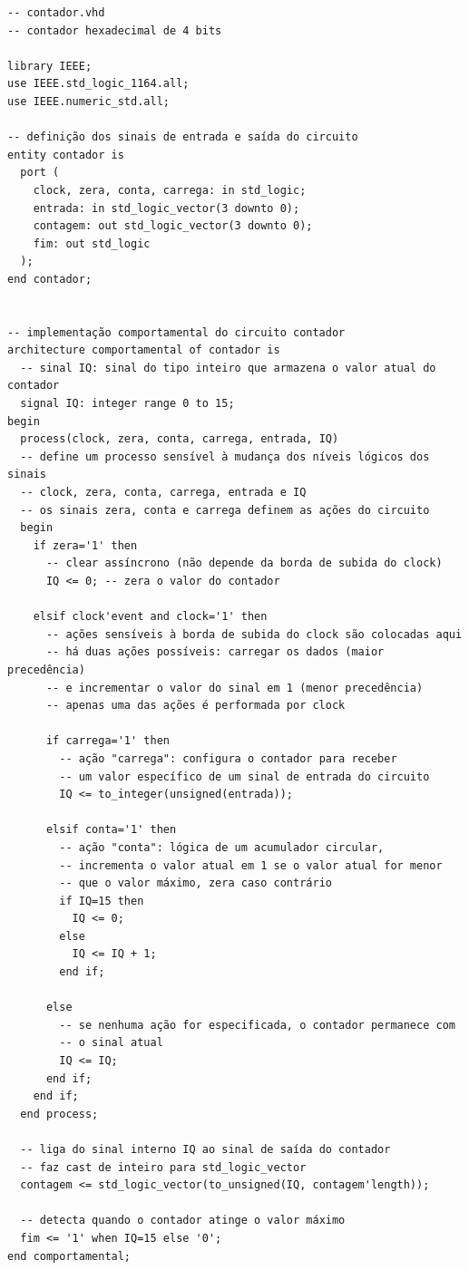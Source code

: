 \documentclass[a4,12pt]{horizon-theme}
\newenvironment{code}{\captionsetup{type=listing}}{}
\begin{document}
\newpage
\begin{code}
  \label{lst:contador}
  \begin{verbatim}
-- contador.vhd
-- contador hexadecimal de 4 bits

library IEEE;
use IEEE.std_logic_1164.all;
use IEEE.numeric_std.all;

-- definição dos sinais de entrada e saída do circuito
entity contador is
  port (
    clock, zera, conta, carrega: in std_logic;
    entrada: in std_logic_vector(3 downto 0);
    contagem: out std_logic_vector(3 downto 0);
    fim: out std_logic
  );
end contador;


-- implementação comportamental do circuito contador
architecture comportamental of contador is
  -- sinal IQ: sinal do tipo inteiro que armazena o valor atual do contador
  signal IQ: integer range 0 to 15;
begin
  process(clock, zera, conta, carrega, entrada, IQ)
  -- define um processo sensível à mudança dos níveis lógicos dos sinais
  -- clock, zera, conta, carrega, entrada e IQ
  -- os sinais zera, conta e carrega definem as ações do circuito
  begin
    if zera='1' then
      -- clear assíncrono (não depende da borda de subida do clock)
      IQ <= 0; -- zera o valor do contador
    
    elsif clock'event and clock='1' then
      -- ações sensíveis à borda de subida do clock são colocadas aqui
      -- há duas ações possíveis: carregar os dados (maior precedência) 
      -- e incrementar o valor do sinal em 1 (menor precedência)
      -- apenas uma das ações é performada por clock
      
      if carrega='1' then
        -- ação "carrega": configura o contador para receber 
        -- um valor específico de um sinal de entrada do circuito
        IQ <= to_integer(unsigned(entrada));
      
      elsif conta='1' then  
        -- ação "conta": lógica de um acumulador circular, 
        -- incrementa o valor atual em 1 se o valor atual for menor 
        -- que o valor máximo, zera caso contrário
        if IQ=15 then 
          IQ <= 0;
        else 
          IQ <= IQ + 1;
        end if;
      
      else
        -- se nenhuma ação for especificada, o contador permanece com
        -- o sinal atual
        IQ <= IQ;
      end if;
    end if;
  end process;

  -- liga do sinal interno IQ ao sinal de saída do contador
  -- faz cast de inteiro para std_logic_vector
  contagem <= std_logic_vector(to_unsigned(IQ, contagem'length));

  -- detecta quando o contador atinge o valor máximo
  fim <= '1' when IQ=15 else '0';
end comportamental;
\end{verbatim}
\end{code}
\end{document}
